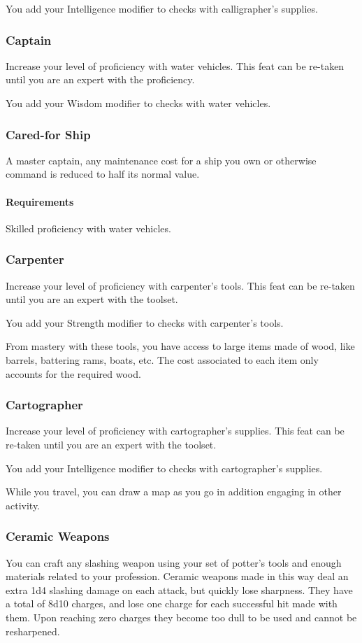     You add your Intelligence modifier to checks with calligrapher's supplies.
\subsubsection{Captain} \label{feat::captain}
    Increase your level of proficiency with water vehicles.
    This feat can be re-taken until you are an expert with the proficiency.

    You add your Wisdom modifier to checks with water vehicles.
\subsubsection{Cared-for Ship} \label{feat::caredforship}
    A master captain, any maintenance cost for a ship you own or otherwise command is reduced to half its normal value.
    \paragraph{Requirements} Skilled proficiency with water vehicles.
\subsubsection{Carpenter} \label{feat::carpenter}
    Increase your level of proficiency with carpenter's tools.
    This feat can be re-taken until you are an expert with the toolset.

    You add your Strength modifier to checks with carpenter's tools.

    From mastery with these tools, you have access to large items made of wood, like barrels, battering rams, boats, etc.
    The cost associated to each item only accounts for the required wood.
\subsubsection{Cartographer} \label{feat::cartographer}
    Increase your level of proficiency with cartographer's supplies.
    This feat can be re-taken until you are an expert with the toolset.

    You add your Intelligence modifier to checks with cartographer's supplies.

    While you travel, you can draw a map as you go in addition engaging in other activity.
\subsubsection{Ceramic Weapons} \label{feat::ceramicweapons}
    You can craft any slashing weapon using your set of potter's tools and enough materials related to your profession.
    Ceramic weapons made in this way deal an extra 1d4 slashing damage on each attack, but quickly lose sharpness.
    They have a total of 8d10 charges, and lose one charge for each successful hit made with them.
    Upon reaching zero charges they become too dull to be used and cannot be resharpened.
